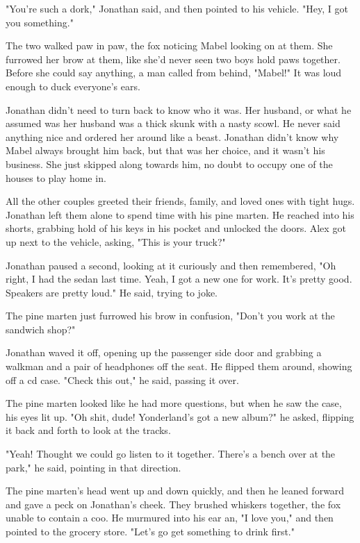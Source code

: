 "You're such a dork," Jonathan said, and then pointed to his vehicle. "Hey, I got you something."

The two walked paw in paw, the fox noticing Mabel looking on at them. She furrowed her brow at them, like she'd never seen two boys hold paws together. Before she could say anything, a man called from behind, "Mabel!" It was loud enough to duck everyone's ears.

Jonathan didn't need to turn back to know who it was. Her husband, or what he assumed was her husband was a thick skunk with a nasty scowl. He never said anything nice and ordered her around like a beast. Jonathan didn't know why Mabel always brought him back, but that was her choice, and it wasn't his business. She just skipped along towards him, no doubt to occupy one of the houses to play home in.

All the other couples greeted their friends, family, and loved ones with tight hugs. Jonathan left them alone to spend time with his pine marten. He reached into his shorts, grabbing hold of his keys in his pocket and unlocked the doors. Alex got up next to the vehicle, asking, "This is your truck?"

Jonathan paused a second, looking at it curiously and then remembered, "Oh right, I had the sedan last time. Yeah, I got a new one for work. It's pretty good. Speakers are pretty loud." He said, trying to joke.

The pine marten just furrowed his brow in confusion, "Don't you work at the sandwich shop?"

Jonathan waved it off, opening up the passenger side door and grabbing a walkman and a pair of headphones off the seat. He flipped them around, showing off a cd case. "Check this out," he said, passing it over.

The pine marten looked like he had more questions, but when he saw the case, his eyes lit up. "Oh shit, dude! Yonderland's got a new album?" he asked, flipping it back and forth to look at the tracks.

"Yeah! Thought we could go listen to it together. There's a bench over at the park," he said, pointing in that direction.

The pine marten's head went up and down quickly, and then he leaned forward and gave a peck on Jonathan's cheek. They brushed whiskers together, the fox unable to contain a coo. He murmured into his ear an, "I love you," and then pointed to the grocery store. "Let's go get something to drink first."

